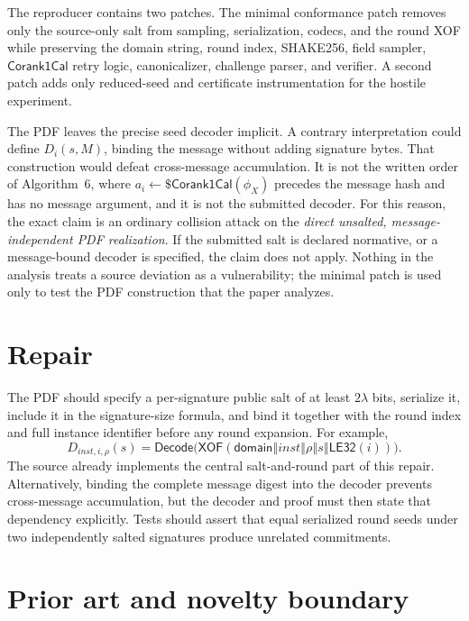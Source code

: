 \documentclass[11pt,a4paper]{article}
\newcommand{\sample}{\mathrel{\leftarrow\$}}
\newcommand{\Corank}{\mathsf{Corank1Cal}}
\begin{document}
The reproducer contains two patches.  The minimal conformance patch removes
only the source-only salt from sampling, serialization, codecs, and the round
XOF while preserving the domain string, round index, SHAKE256, field sampler,
$\Corank$ retry logic, canonicalizer, challenge parser, and verifier.  A second
patch adds only reduced-seed and certificate instrumentation for the hostile
experiment.

The PDF leaves the precise seed decoder implicit.  A contrary interpretation
could define $D_i(s,M)$, binding the message without adding signature bytes.
That construction would defeat cross-message accumulation.  It is not the
written order of Algorithm~6, where $a_i\sample\Corank(\phi_X)$ precedes the
message hash and has no message argument, and it is not the submitted decoder.
For this reason, the exact claim is an ordinary collision attack on the
\emph{direct unsalted, message-independent PDF realization}.  If the submitted
salt is declared normative, or a message-bound decoder is specified, the
claim does not apply.  Nothing in the analysis treats a source deviation as a
vulnerability; the minimal patch is used only to test the PDF construction
that the paper analyzes.

\section{Repair}

The PDF should specify a per-signature public salt of at least $2\lambda$ bits,
serialize it, include it in the signature-size formula, and bind it together
with the round index and full instance identifier before any round expansion.
For example,
\begin{equation}
 D_{\mathit{inst},i,\rho}(s)=
 \mathsf{Decode}\bigl(
   \mathsf{XOF}(\mathsf{domain}\mathbin\Vert\mathit{inst}
   \mathbin\Vert\rho\mathbin\Vert s\mathbin\Vert\mathsf{LE32}(i))
 \bigr).                                                \label{eq:repair}
\end{equation}
The source already implements the central salt-and-round part of this repair.
Alternatively, binding the complete message digest into the decoder prevents
cross-message accumulation, but the decoder and proof must then state that
dependency explicitly.  Tests should assert that equal serialized round seeds
under two independently salted signatures produce unrelated commitments.

\section{Prior art and novelty boundary}
\end{document}
